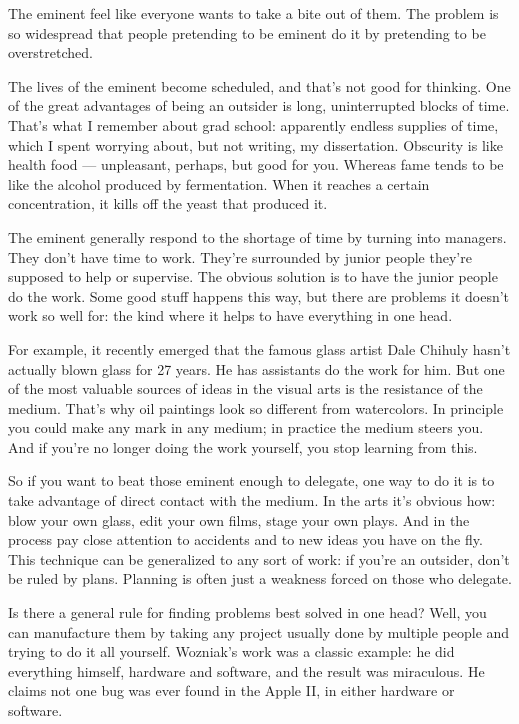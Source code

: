 The eminent feel like everyone wants to take a bite out of them. The
problem is so widespread that people pretending to be eminent do it by
pretending to be overstretched.

The lives of the eminent become scheduled, and that's not good for
thinking. One of the great advantages of being an outsider is long,
uninterrupted blocks of time. That's what I remember about grad school:
apparently endless supplies of time, which I spent worrying about, but
not writing, my dissertation. Obscurity is like health food ---
unpleasant, perhaps, but good for you. Whereas fame tends to be like the
alcohol produced by fermentation. When it reaches a certain
concentration, it kills off the yeast that produced it.

The eminent generally respond to the shortage of time by turning into
managers. They don't have time to work. They're surrounded by junior
people they're supposed to help or supervise. The obvious solution is to
have the junior people do the work. Some good stuff happens this way,
but there are problems it doesn't work so well for: the kind where it
helps to have everything in one head.

For example, it recently emerged that the famous glass artist Dale
Chihuly hasn't actually blown glass for 27 years. He has assistants do
the work for him. But one of the most valuable sources of ideas in the
visual arts is the resistance of the medium. That's why oil paintings
look so different from watercolors. In principle you could make any mark
in any medium; in practice the medium steers you. And if you're no
longer doing the work yourself, you stop learning from this.

So if you want to beat those eminent enough to delegate, one way to do
it is to take advantage of direct contact with the medium. In the arts
it's obvious how: blow your own glass, edit your own films, stage your
own plays. And in the process pay close attention to accidents and to
new ideas you have on the fly. This technique can be generalized to any
sort of work: if you're an outsider, don't be ruled by plans. Planning
is often just a weakness forced on those who delegate.

Is there a general rule for finding problems best solved in one head?
Well, you can manufacture them by taking any project usually done by
multiple people and trying to do it all yourself. Wozniak's work was a
classic example: he did everything himself, hardware and software, and
the result was miraculous. He claims not one bug was ever found in the
Apple II, in either hardware or software.

